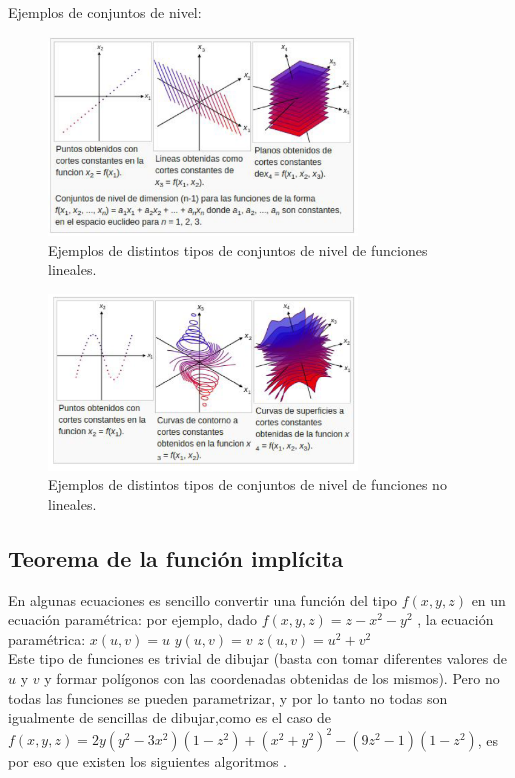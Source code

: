 \documentclass[12pt]{article}
\begin{document}
Ejemplos de conjuntos de nivel:
\begin{figure}[h!]
\includegraphics[width=0.73\textwidth,center]{meshers1.png}
\caption{Ejemplos de distintos tipos de conjuntos de nivel de funciones lineales.}
\end{figure}
\begin{figure}[h!]
\includegraphics[width=0.73\textwidth,center]{meshers2.png}
\caption{Ejemplos de distintos tipos de conjuntos de nivel de funciones no lineales.}
\end{figure}
\clearpage
\subsection{Teorema de la función implícita}
En algunas ecuaciones es sencillo convertir una función del tipo $f(x,y,z)$ en un ecuación paramétrica: por ejemplo, dado $f(x,y,z)  = z- x^2 - y^2$ , la ecuación paramétrica: 
$x(u,v) = u$
$y(u,v) = v$
$z(u,v) = u^2+v^2$
\\Este tipo de funciones es trivial de dibujar (basta con tomar diferentes valores de $u$ y $v$ y formar polígonos con las coordenadas obtenidas de los mismos).
Pero no todas las funciones se pueden parametrizar, y por lo tanto no todas son igualmente de sencillas de dibujar,como es el caso de  $f(x,y,z) = 2y(y^2-3x^2)(1-z^2)+(x^2+y^2)^2-(9z^2-1)(1-z^2)$, es por eso que existen los siguientes algoritmos \cite{implicitas}.
\end{document}
